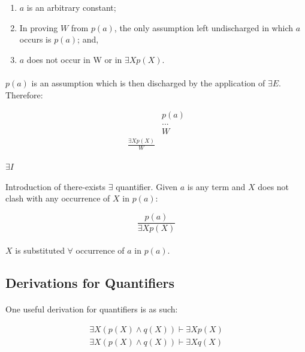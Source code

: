 \documentclass{article}
\begin{document}
\begin{multicols}{2}
  \begin{enumerate}
  \item $a$ is an arbitrary constant;
  \item In proving $W$ from $p(a)$, the only assumption left undischarged in which $a$ occurs is $p(a)$; and,
  \item $a$ does not occur in W or in $\exists X p(X)$.
  \end{enumerate}
  
  \paragraph{} $p(a)$ is an assumption which is then discharged by the application of $\exists E$. Therefore:
  
   \begin{align*}
   &p(a) \tag*{\tiny Assume}\\
   &...\\
   &W\\
   \frac{\exists X p(X)\tag*{\tiny Given}}{W}
  \end{align*}
  
   \paragraph{$\exists I$} Introduction of there-exists $\exists$ quantifier. Given $a$ is any term and $X$ does not clash with any occurrence of $X$ in $p(a)$:
  
   \begin{equation*}
   \frac{p(a)}{\exists X p(X)}
  \end{equation*}
  
  \paragraph{} $X$ is substituted $\forall$ occurrence of $a$ in $p(a)$.
  
  \subsection{Derivations for Quantifiers}
  
  \paragraph{} One useful derivation for quantifiers is as such:
  
   \begin{align*}
   \exists X (p(X) \land q(X)) \vdash \exists X p(X)\\
   \exists X (p(X) \land q(X)) \vdash \exists X q(X)
   \end{align*}
   

\end{multicols}
\end{document}
